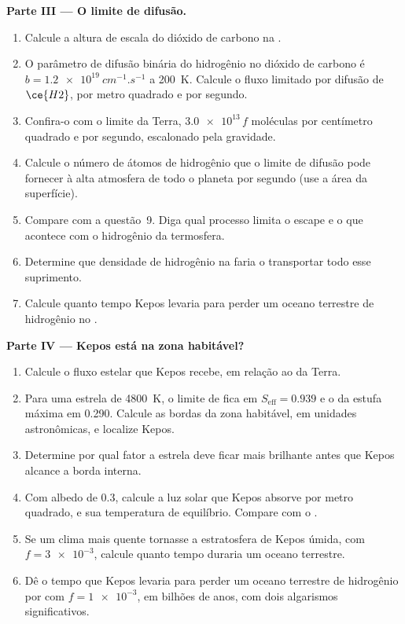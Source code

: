 \begin{problem}
\medskip\noindent\textbf{Parte III --- O limite de difusão.}
\begin{enumerate}[resume]
\item Calcule a altura de escala do dióxido de carbono na .
\item O parâmetro de difusão binária do hidrogênio no dióxido de carbono é
  $b = \qty{1.2e19}{cm^{-1}.s^{-1}}$ a \qty{200}{K}. Calcule o
  fluxo limitado por difusão de $\ce{H2}$, por metro quadrado e por segundo.
\item Confira-o com o limite da Terra, $\num{3.0e13}\,f$ moléculas por
  centímetro quadrado e por segundo, escalonado pela gravidade.
\item Calcule o número de átomos de hidrogênio que o limite de difusão pode
  fornecer à alta atmosfera de todo o planeta por segundo (use a
  área da superfície).
\item Compare com a questão~9. Diga qual processo limita o escape e o que
  acontece com o hidrogênio da termosfera.
\item Determine que densidade de hidrogênio na  faria o  transportar
  todo esse suprimento.
\item Calcule quanto tempo Kepos levaria para perder um oceano terrestre de hidrogênio no
  .
\end{enumerate}

\medskip\noindent\textbf{Parte IV --- Kepos está na zona habitável?}
\begin{enumerate}[resume]
\item Calcule o fluxo estelar que Kepos recebe, em relação ao da Terra.
\item Para uma estrela de \qty{4800}{K}, o limite de  fica em
  $S_\mathrm{eff} = 0.939$ e o da estufa máxima em 0.290. Calcule as
  bordas da zona habitável, em unidades astronômicas, e localize Kepos.
\item Determine por qual fator a estrela deve ficar mais brilhante antes que Kepos alcance a
  borda interna.
\item Com albedo de 0.3, calcule a luz solar que Kepos absorve por metro quadrado,
  e sua temperatura de equilíbrio. Compare com o .
\item Se um clima mais quente tornasse a estratosfera de Kepos úmida, com
  $f = \num{3e-3}$, calcule quanto tempo duraria um oceano terrestre.
\item Dê o tempo que Kepos levaria para perder um oceano terrestre de hidrogênio por
   com $f = \num{1e-3}$, em bilhões de anos, com
  dois algarismos significativos.
\end{enumerate}
\end{problem}
